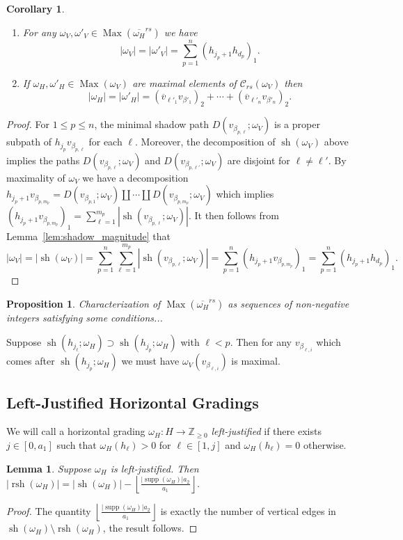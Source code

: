 \documentclass{amsart}
\newtheorem{corollary}[theorem]{Corollary}
\newtheorem{lemma}[theorem]{Lemma}
\newtheorem{proposition}[theorem]{Proposition}
\newcommand{\cC}{\mathcal{C}}
\newcommand{\ZZ}{\mathbb{Z}}
\newcommand{\supp}{\operatorname{supp}}
\newcommand{\Max}{\operatorname{Max}}
\newcommand{\rsh}{\operatorname{rsh}}
\newcommand{\sh}{\operatorname{sh}}
\newenvironment{enumeratea}{\begin{enumerate}[\upshape (a)]}
                           {\end{enumerate}}
\begin{document}
 \begin{corollary}\label{cor:maximal_shadows}\mbox{}
  \begin{enumeratea}
   \item For any $\omega_V,\omega'_V\in\Max(\overline{\omega_H}^{rs})$ we have 
   \[|\omega_V|=|\omega'_V|=\sum\limits_{p=1}^n(h_{j_p+1}h_{d_p})_1.\]
   \item If $\omega_H,\omega'_H\in\Max(\omega_V)$ are maximal elements of $\cC_{rs}(\omega_V)$ then 
   \[|\omega_H|=|\omega'_H|=(\overline{v}_{\ell'_1}v_{\beta'_1})_2+\cdots+(\overline{v}_{\ell'_n}v_{\beta'_n})_2.\]
  \end{enumeratea}
 \end{corollary}
 \begin{proof}
  For $1\le p\le n$, the minimal shadow path $D(v_{\beta_{p,\ell}};\omega_V)$ is a proper subpath of $h_{j_p}v_{\beta_{p,\ell}}$ for each $\ell$.  Moreover, the decomposition of $\sh(\omega_V)$ above implies the paths $D(v_{\beta_{p,\ell}};\omega_V)$ and $D(v_{\beta_{p,\ell'}};\omega_V)$ are disjoint for $\ell\ne\ell'$.  By maximality of $\omega_V$ we have a decomposition $h_{j_p+1}v_{\beta_{p,m_p}}=D(v_{\beta_{p,1}};\omega_V)\amalg\cdots\amalg D(v_{\beta_{p,m_p}};\omega_V)$ which implies 
  $(h_{j_p+1}v_{\beta_{p,m_p}})_1=\sum\limits_{\ell=1}^{m_p}|\sh(v_{\beta_{p,\ell}};\omega_V)|$.  It then follows from Lemma~\ref{lem:shadow_magnitude} that
  \[|\omega_V|=|\sh(\omega_V)|=\sum\limits_{p=1}^n\sum\limits_{\ell=1}^{m_p}|\sh(v_{\beta_{p,\ell}};\omega_V)|=\sum\limits_{p=1}^n(h_{j_p+1}v_{\beta_{p,m_p}})_1=\sum\limits_{p=1}^n(h_{j_p+1}h_{d_p})_1.\]
 \end{proof}

 \begin{proposition}
  Characterization of $\Max(\overline{\omega_H}^{rs})$ as sequences of non-negative integers satisfying some conditions...
 \end{proposition}

 Suppose $\sh(h_{j_\ell};\omega_H)\supset\sh(h_{j_p};\omega_H)$ with $\ell<p$.  Then for any $v_{\beta_{\ell,i}}$ which comes after $\sh(h_{j_p};\omega_H)$ we must have $\omega_V(v_{\beta_{\ell,i}})$ is maximal.

 \subsection{Left-Justified Horizontal Gradings}
 We will call a horizontal grading $\omega_H:H\to\ZZ_{\ge0}$ \emph{left-justified} if there exists $j\in[0,a_1]$ such that $\omega_H(h_\ell)>0$ for $\ell\in[1,j]$ and $\omega_H(h_\ell)=0$ otherwise.
 \begin{lemma}
  Suppose $\omega_H$ is left-justified.  Then $|\rsh(\omega_H)|=|\sh(\omega_H)|-\left\lfloor\frac{|\supp(\omega_H)|a_2}{a_1}\right\rfloor$.
 \end{lemma}
 \begin{proof}
  The quantity $\left\lfloor\frac{|\supp(\omega_H)|a_2}{a_1}\right\rfloor$ is exactly the number of vertical edges in $\sh(\omega_H)\setminus\rsh(\omega_H)$, the result follows.
 \end{proof}
 
\end{document}
